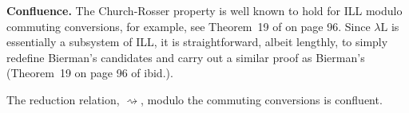 \documentclass{llncs}
\newcommand{\redto}{\rightsquigarrow}
\newcommand{\Lnt}[1]{\mathit{#1}}
\begin{document}
\noindent

\textbf{Confluence.} The Church-Rosser property is well known to hold
for ILL modulo commuting conversions, for example, see Theorem~19 of
\cite{Bierman:1994} on page 96.  Since $\lambda\text{L}$ is
essentially a subsystem of ILL, it is straightforward, albeit
lengthly, to simply redefine Bierman's candidates
and carry out a similar proof as Bierman's (Theorem~19 on page 96 of ibid.).  
\begin{theorem}[Confluence]
  \label{theorem:confluence}
  The reduction relation, $ \redto $, modulo the commuting conversions
  is confluent.
\end{theorem}
\end{document}
